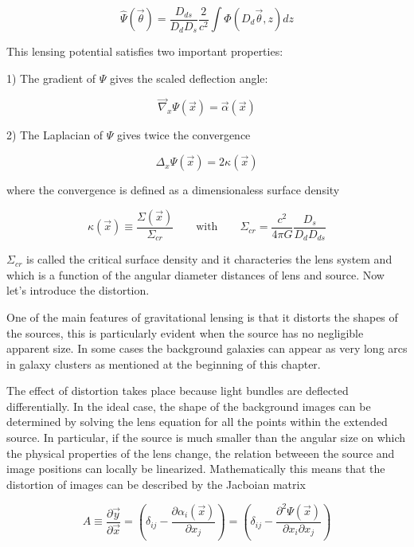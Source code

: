 \begin{equation}
\hat{\Psi}(\vec{\theta})=\frac{D_{ds}}{D_{d}D_{s}}\frac{2}{c^{2}}\int\Phi(D_{d}\vec{\theta},z)dz
\end{equation}

This lensing potential satisfies two important properties:

1) The gradient of $\Psi$ gives the scaled deflection angle:

\begin{equation}
\vec{\nabla}_{x}\Psi(\vec{x})=\vec{\alpha}(\vec{x})
\end{equation}

2) The Laplacian of $\Psi$ gives twice the convergence

\begin{equation}
\Delta_{x}\Psi(\vec{x})=2\kappa(\vec{x})
\end{equation}

where the convergence is defined as a dimensionaless surface density

\begin{equation}
\kappa(\vec{x})\equiv \frac{\Sigma(\vec{x})}{\Sigma_{cr}}\qquad \text{with} \qquad \Sigma_{cr}=\frac{c^{2}}{4\pi G}\frac{D_s}{D_d D_{ds}}
\end{equation}

$\Sigma_{cr}$ is called the critical surface density and it characteries the lens system and which is a function of the angular diameter distances of lens and source. Now let's introduce the distortion.

One of the main features of gravitational lensing is that it distorts the shapes of the sources, this is particularly evident when the source has no negligible apparent size. In some cases the background galaxies can appear as very long arcs in galaxy clusters as mentioned at the beginning of this chapter. 

The effect of distortion takes place because light bundles are deflected differentially. In the ideal case, the shape of the background images can be determined by solving the lens equation for all the points within the extended source. In particular, if the source is much smaller than the angular size on which the physical properties of the lens change, the relation betweeen the source and image positions can locally be linearized. Mathematically this means that the distortion of images can be described by the Jacboian matrix

\begin{equation}
A\equiv\frac{\partial\vec{y}}{\partial\vec{x}}=\left(\delta_{ij}-\frac{\partial\alpha_{i}(\vec{x})}{\partial x_{j}}\right)=\left(\delta_{ij}-\frac{\partial^{2}\Psi(\vec{x})}{\partial x_{i}\partial x_{j}}\right)
\end{equation}

